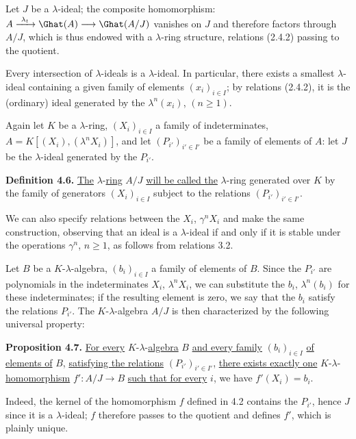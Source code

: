 Let \(J\) be a \(\lambda\)-ideal; the composite homomorphism: \(A\xrightarrow{\ \lambda_t\ }\Ghat(A)\longrightarrow\Ghat(A/J)\) vanishes on \(J\) and therefore factors through \(A/J\), which is thus endowed
%
with a \(\lambda\)-ring structure, relations (2.4.2) passing to the quotient.

Every intersection of \(\lambda\)-ideals is a \(\lambda\)-ideal. In particular, there exists a smallest \(\lambda\)-ideal containing a given family of elements \((x_i)_{i\in I}\); by relations (2.4.2), it is the (ordinary) ideal generated by the \(\lambda^n(x_i)\), \((n\ge1)\).

Again let \(K\) be a \(\lambda\)-ring, \((X_i)_{i\in I}\) a family of indeterminates, \(A=K[(X_i),(\lambda^n X_i)]\), and let \((P_{i'})_{i'\in I'}\) be a family of elements of \(A\): let \(J\) be the \(\lambda\)-ideal generated by the \(P_{i'}\).

\textbf{Definition 4.6.} \uline{The} \(\lambda\)-\uline{ring} \(A/J\) \uline{will be called the} \(\lambda\)-ring generated over \(K\) by the family of generators \((X_i)_{i\in I}\) subject to the relations \((P_{i'})_{i'\in I'}\).

We can also specify relations between the \(X_i\), \(\gamma^n X_i\) and make the same construction, observing that an ideal is a \(\lambda\)-ideal if and only if it is stable under the operations \(\gamma^n\), \(n\ge1\), as follows from relations 3.2.

Let \(B\) be a \(K\)-\(\lambda\)-algebra, \((b_i)_{i\in I}\) a family of elements of \(B\). Since the \(P_{i'}\) are polynomials in the indeterminates \(X_i\), \(\lambda^n X_i\), we can substitute the \(b_i\), \(\lambda^n(b_i)\) for these indeterminates; if the resulting element is zero, we say that the \(b_i\) satisfy the relations \(P_{i'}\). The \(K\)-\(\lambda\)-algebra \(A/J\) is then characterized by the following universal property:

\textbf{Proposition 4.7.} \uline{For every} \(K\)-\(\lambda\)-\uline{algebra} \(B\) \uline{and every family} \((b_i)_{i\in I}\) \uline{of elements of} \(B\), \uline{satisfying the relations} \((P_{i'})_{i'\in I'}\), \uline{there exists exactly one} \(K\)-\(\lambda\)-\uline{homomorphism} \(f':A/J\to B\) \uline{such that for every} \(i\), we have \(f'(X_i)=b_i\).

Indeed, the kernel of the homomorphism \(f\) defined in 4.2 contains the \(P_{i'}\), hence \(J\) since it is a \(\lambda\)-ideal; \(f\) therefore passes to the quotient and defines
%
\(f'\), which is plainly unique.

